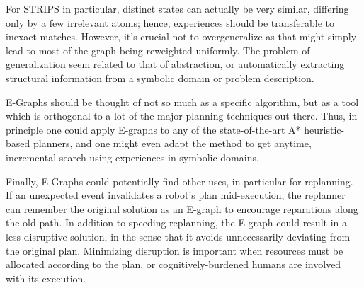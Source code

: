 \documentclass[letterpaper]{article}
\begin{document}
For STRIPS in particular, distinct states can actually be very similar, differing only by a few irrelevant atoms; hence, experiences should be transferable to inexact matches. However, it's crucial not to overgeneralize as that might simply lead to most of the graph being reweighted uniformly. The problem of generalization seem related to that of abstraction, or automatically extracting structural information from a symbolic domain or problem description.

E-Graphs should be thought of not so much as a specific algorithm, but as a tool which is orthogonal to a lot of the major planning techniques out there. Thus, in principle one could apply E-graphs to any of the state-of-the-art A* heuristic-based planners, and one might even adapt the method to get anytime, incremental search using experiences in symbolic domains.

Finally, E-Graphs could potentially find other uses, in particular for replanning. If an unexpected event invalidates a robot's plan mid-execution, the replanner can remember the original solution as an E-graph to encourage reparations along the old path. In addition to speeding replanning, the E-graph could result in a less disruptive solution, in the sense that it avoids unnecessarily deviating from the original plan. Minimizing disruption is important when resources must be allocated according to the plan, or cognitively-burdened humans are involved with its execution.



\end{document}
